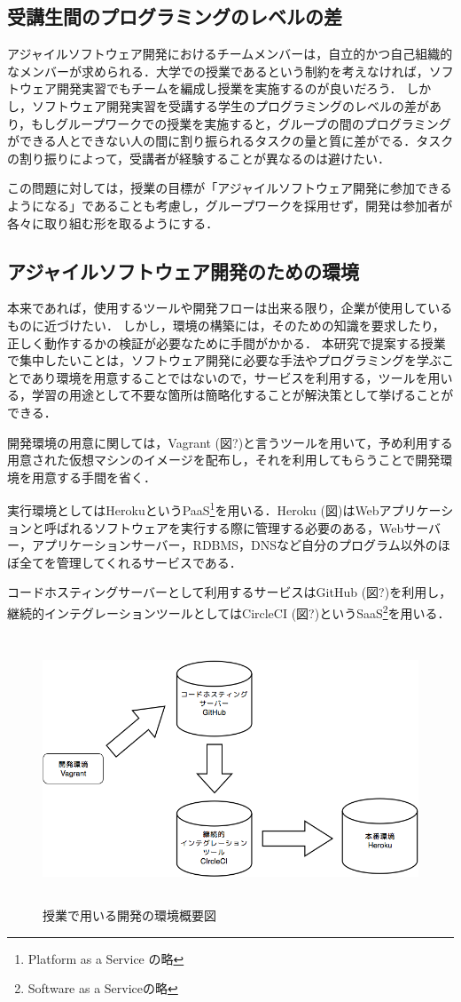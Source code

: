 \subsection{受講生間のプログラミングのレベルの差}

アジャイルソフトウェア開発におけるチームメンバーは，自立的かつ自己組織的なメンバーが求められる．大学での授業であるという制約を考えなければ，ソフトウェア開発実習でもチームを編成し授業を実施するのが良いだろう．
しかし，ソフトウェア開発実習を受講する学生のプログラミングのレベルの差があり，もしグループワークでの授業を実施すると，グループの間のプログラミングができる人とできない人の間に割り振られるタスクの量と質に差がでる．タスクの割り振りによって，受講者が経験することが異なるのは避けたい．

この問題に対しては，授業の目標が「アジャイルソフトウェア開発に参加できるようになる」であることも考慮し，グループワークを採用せず，開発は参加者が各々に取り組む形を取るようにする．

\subsection{アジャイルソフトウェア開発のための環境}

本来であれば，使用するツールや開発フローは出来る限り，企業が使用しているものに近づけたい．
しかし，環境の構築には，そのための知識を要求したり，正しく動作するかの検証が必要なために手間がかかる．
本研究で提案する授業で集中したいことは，ソフトウェア開発に必要な手法やプログラミングを学ぶことであり環境を用意することではないので，サービスを利用する，ツールを用いる，学習の用途として不要な箇所は簡略化することが解決策として挙げることができる．

開発環境の用意に関しては，Vagrant (図?)と言うツールを用いて，予め利用する用意された仮想マシンのイメージを配布し，それを利用してもらうことで開発環境を用意する手間を省く．

実行環境としてはHerokuというPaaS\footnote{Platform as a Service の略}を用いる．Heroku (図)はWebアプリケーションと呼ばれるソフトウェアを実行する際に管理する必要のある，Webサーバー，アプリケーションサーバー，RDBMS，DNSなど自分のプログラム以外のほぼ全てを管理してくれるサービスである．

コードホスティングサーバーとして利用するサービスはGitHub (図?)を利用し，継続的インテグレーションツールとしてはCircleCI (図?)というSaaS\footnote{Software as a Serviceの略}を用いる．

\begin{figure}[H]
\centering
\includegraphics[height=8cm]{./assets/images/class_dev_env.png}
\caption{授業で用いる開発の環境概要図}
\label{fig:class_dev_env}
\end{figure}
